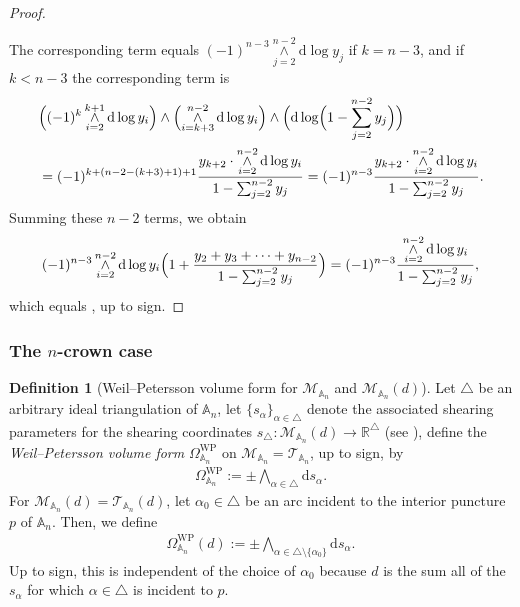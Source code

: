 \documentclass{amsart}
\theoremstyle{definition}
\newtheorem{definition}[proposition]{Definition}
\begin{document}
\begin{proof}
\begin{itemize}
\end{itemize}
The corresponding term equals $(-1)^{n-3}\mathop{\wedge}\limits_{j=2}^{n-2}\mathrm{d}\log y_j$ if $k=n-3$, and if $k<n-3$ the corresponding term is
\begin{align}
& \Bigl((-1)^k \mathop{\wedge}\limits_{i=2}^{k+1} \mathrm{d}\log y_i \Bigr) 
\wedge 
\Bigl(\mathop{\wedge}\limits_{i=k+3}^{n-2} \mathrm{d}\log y_i \Bigr)  
\wedge 
\Bigl(\mathrm{d}\log \Bigl(1- \sum_{j=2}^{n-2}y_j \Bigr)\Bigr) \\ 
&= 
(-1)^{k+(n-2-(k+3)+1)+1} \frac{y_{k+2} \cdot \mathop{\wedge}\limits_{i=2}^{n-2} \mathrm{d}\log y_i}{1- \sum_{j=2}^{n-2}y_j}
= 
(-1)^{n-3} \frac{y_{k+2} \cdot \mathop{\wedge}\limits_{i=2}^{n-2} \mathrm{d}\log y_i}{1- \sum_{j=2}^{n-2}y_j} .
\end{align}
Summing these $n-2$ terms, we obtain
\[
(-1)^{n-3} \mathop{\wedge}\limits_{i=2}^{n-2} 
\mathrm{d}\log y_i \Bigl(1+ \frac{y_2+y_3+\cdots+y_{n-2}}{1- \sum_{j=2}^{n-2}y_j}\Bigr) 
= (-1)^{n-3} \frac{\mathop{\wedge}\limits_{i=2}^{n-2} \mathrm{d}\log y_i}{1- \sum_{j=2}^{n-2}y_j},
\]
which equals , up to sign.
\end{proof}









\subsubsection{The $n$-crown case}

\begin{definition}[Weil--Petersson volume form for $\mathcal{M}_{\mathbb{A}_n}$ and $\mathcal{M}_{\mathbb{A}_n}(d)$]
Let $\triangle$ be an arbitrary ideal triangulation of $\mathbb{A}_n$, let $\{s_\alpha\}_{\alpha\in\triangle}$ denote the associated shearing parameters for the shearing coordinates $s_\triangle:\mathcal{M}_{\mathbb{A}_n}(d)\to\mathbb{R}^{\triangle}$ (see ), define the \emph{Weil--Petersson volume form} $\Omega^{\mathrm{WP}}_{\mathbb{A}_n}$ on $\mathcal{M}_{\mathbb{A}_n}=\mathcal{T}_{\mathbb{A}_n}$, up to sign, by
\begin{align}
\label{eq:vol-form-crowned-surf}  
\Omega^{\mathrm{WP}}_{\mathbb{A}_n} 
:= \pm \bigwedge_{\alpha\in\triangle}\mathrm{d}s_\alpha.
\end{align}
For $\mathcal{M}_{\mathbb{A}_n}(d)=\mathcal{T}_{\mathbb{A}_n}(d)$, let $\alpha_0\in\triangle$ be an arc incident to the interior puncture $p$ of $\mathbb{A}_n$. Then, we define
\begin{align}
\label{eq:vol-form-crowned-surf-neck}  
\Omega^{\mathrm{WP}}_{\mathbb{A}_n}(d) 
:= \pm \bigwedge_{\alpha\in\triangle\setminus\{\alpha_0\}}
\mathrm{d}s_\alpha.
\end{align}
Up to sign, this is independent of the choice of $\alpha_0$ because $d$ is the sum all of the $s_\alpha$ for which $\alpha\in\triangle$ is incident to $p$.
\end{definition}
\end{document}
